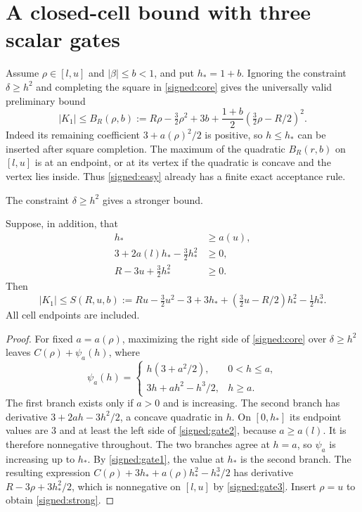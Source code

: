 \section{A closed-cell bound with three scalar gates}

Assume $\rho\in[l,u]$ and $|\beta|\le b<1$, and put $h_*=1+b$.
Ignoring the constraint $\delta\ge h^2$ and completing the square in
\eqref{signed:core} gives the universally valid preliminary bound
\begin{equation}\label{signed:easy}
 |K_1|\le B_R(\rho,b):=
 R\rho-\tfrac32\rho^2+3b+
 \frac{1+b}{2}(\tfrac32\rho-R/2)^2.
\end{equation}
Indeed its remaining coefficient $3+a(\rho)^2/2$ is positive, so
$h\le h_*$ can be inserted after square completion.
The maximum of the quadratic $B_R(r,b)$ on $[l,u]$ is at an endpoint,
or at its vertex if the quadratic is concave and the vertex lies inside.
Thus \eqref{signed:easy} already has a finite exact acceptance rule.

The constraint $\delta\ge h^2$ gives a stronger bound.

\begin{theorem}\label{signed:theorem}
Suppose, in addition, that
\begin{align}
 h_*&\ge a(u),\label{signed:gate1}\\
 3+2a(l)h_*-\tfrac32h_*^2&\ge0,\label{signed:gate2}\\
 R-3u+\tfrac32h_*^2&\ge0.\label{signed:gate3}
\end{align}
Then
\begin{equation}\label{signed:strong}
 |K_1|\le S(R,u,b):=
 Ru-\tfrac32u^2-3+3h_*+
 (\tfrac32u-R/2)h_*^2-\tfrac12h_*^3.
\end{equation}
All cell endpoints are included.
\end{theorem}
\begin{proof}
For fixed $a=a(\rho)$, maximizing the right side of
\eqref{signed:core} over $\delta\ge h^2$ leaves $C(\rho)+\psi_a(h)$,
where
\[
 \psi_a(h)=
 \begin{cases}
 h(3+a^2/2),&0<h\le a,\\
 3h+ah^2-h^3/2,&h\ge a.
 \end{cases}
\]
The first branch exists only if $a>0$ and is increasing.
The second branch has derivative $3+2ah-3h^2/2$, a concave quadratic
in $h$. On $[0,h_*]$ its endpoint values are $3$ and at least the
left side of \eqref{signed:gate2}, because $a\ge a(l)$.
It is therefore nonnegative throughout. The two branches agree at
$h=a$, so $\psi_a$ is increasing up to $h_*$.
By \eqref{signed:gate1}, the value at $h_*$ is the second branch.
The resulting expression
$C(\rho)+3h_*+a(\rho)h_*^2-h_*^3/2$ has derivative
$R-3\rho+3h_*^2/2$, which is nonnegative on $[l,u]$ by
\eqref{signed:gate3}. Insert $\rho=u$ to obtain \eqref{signed:strong}.
\end{proof}

